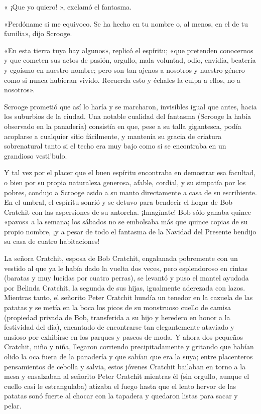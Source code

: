 \documentclass{novela}
\begin{document}
 « ¡Que yo quiero! », exclamó el fantasma.

 «Perdóname si me equivoco. Se ha hecho en tu nombre o, al menos, en el de tu familia», dijo Scrooge.

 «En esta tierra tuya hay algunos», replicó el espíritu; «que pretenden conocernos y que cometen sus actos de pasión, orgullo, mala voluntad, odio, envidia, beatería y egoísmo en nuestro nombre; pero son tan ajenos a nosotros y nuestro género como si nunca hubieran vivido. Recuerda esto y échales la culpa a ellos, no a nosotros».

 Scrooge prometió que así lo haría y se marcharon, invisibles igual que antes, hacia los suburbios de la ciudad. Una notable cualidad del fantasma (Scrooge la había observado en la panadería) consistía en que, pese a su talla gigantesca, podía acoplarse a cualquier sitio fácilmente, y mantenía su gracia de criatura sobrenatural tanto si el techo era muy bajo como si se encontraba en un grandioso vesti'bulo.

 Y tal vez por el placer que el buen espíritu encontraba en demostrar esa facultad, o bien por su propia naturaleza generosa, afable, cordial, y su simpatía por los pobres, condujo a Scrooge asido a su manto directamente a casa de su escribiente. En el umbral, el espíritu sonrió y se detuvo para bendecir el hogar de Bob Cratchit con las aspersiones de su antorcha. ¡Imagínate! Bob sólo ganaba quince «pavos» a la semana; los sábados no se embolsaba más que quince copias de su propio nombre, ¡y a pesar de todo el fantasma de la Navidad del Presente bendijo su casa de cuatro habitaciones!

 La señora Cratchit, esposa de Bob Cratchit, engalanada pobremente con un vestido al que ya le había dado la vuelta dos veces, pero esplendoroso en cintas (baratas y muy lucidas por cuatro perras), se levantó y puso el mantel ayudada por Belinda Cratchit, la segunda de sus hijas, igualmente aderezada con lazos. Mientras tanto, el señorito Peter Cratchit hundía un tenedor en la cazuela de las patatas y se metía en la boca los picos de su monstruoso cuello de camisa (propiedad privada de Bob, transferida a su hijo y heredero en honor a la festividad del día), encantado de encontrarse tan elegantemente ataviado y ansioso por exhibirse en los parques y paseos de moda. Y ahora dos pequeños Cratchit, niño y niña, llegaron corriendo precipitadamente y gritando que habían olido la oca fuera de la panadería y que sabían que era la suya; entre placenteros pensamientos de cebolla y salvia, estos jóvenes Cratchit bailaban en torno a la mesa y ensalzaban al señorito Peter Cratchit mientras él (sin orgullo, aunque el cuello casi le estrangulaba) atizaba el fuego hasta que el lento hervor de las patatas sonó fuerte al chocar con la tapadera y quedaron listas para sacar y pelar.
\end{document}
